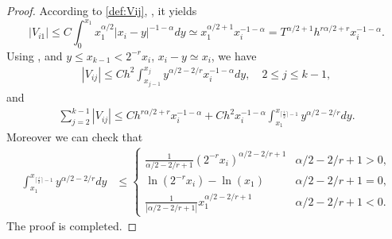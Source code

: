 \documentclass{amsart}
\theoremstyle{definition}
\theoremstyle{remark}
\numberwithin{equation}{section}
\begin{document}
\begin{proof}
  According to \eqref{def:Vij}, , it yields
  \begin{equation*}
    |V_{i1}| \le C \int_{0}^{x_1} x_1^{\alpha/2} |x_i-y|^{-1-\alpha}dy \simeq x_1^{\alpha/2+1} x_i^{-1-\alpha} = T^{\alpha/2+1} h^{r\alpha/2+r} x_i^{-1-\alpha}.
  \end{equation*}
  Using ,  and $y\le x_{k-1} < 2^{-r}x_i $, \(x_i - y \simeq x_i\), we have
  \begin{equation*}
    \begin{aligned}
      |V_{ij}| 
             \le C h^2 \int_{x_{j-1}}^{x_{j}} y^{\alpha/2-2/r} x_i^{-1-\alpha} dy, \quad 2 \le j \le k-1,
    \end{aligned}
  \end{equation*}
  and
  \begin{equation*}
    \begin{aligned}
      \sum_{j=2}^{k-1} |V_{ij}|
        \le C h^{r\alpha/2+r} x_i^{-1-\alpha} + C h^2 x_i^{-1-\alpha} \int_{x_1}^{x_{\lceil\frac{i}{2}\rceil-1}} y^{\alpha/2-2/r} dy.
    \end{aligned}
  \end{equation*}
  Moreover we can check that
  \begin{equation*}
    \begin{aligned}
      \int_{x_1}^{x_{\lceil\frac{i}{2}\rceil-1}} y^{\alpha/2-2/r} dy
       & \le \begin{cases}
               \frac{1}{\alpha/2-2/r+1} (2^{-r} x_i)^{\alpha/2-2/r+1}  & \alpha/2-2/r+1 > 0, \\
               \ln(2^{-r} x_i) - \ln(x_1)                              & \alpha/2-2/r+1 = 0, \\
               \frac{1}{|\alpha/2-2/r+1|} x_1^{\alpha/2-2/r+1}         & \alpha/2-2/r+1 < 0.
             \end{cases}
    \end{aligned}
  \end{equation*}
  The proof is completed.
\end{proof}
\end{document}
